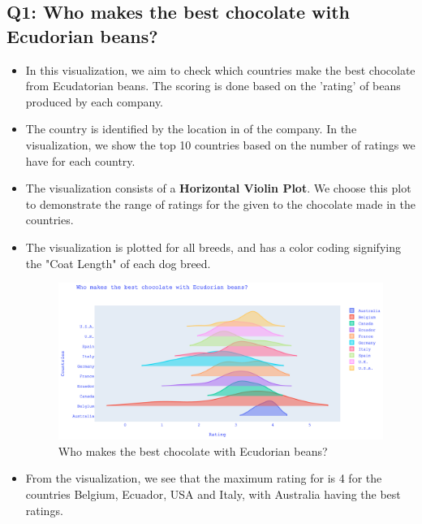 \documentclass[a4paper]{article}
\begin{document}
\subsection{Q1: Who makes the best chocolate with Ecudorian beans?}
\begin{itemize}
    \item In this visualization, we aim to check which countries make the best chocolate from Ecudatorian beans. The scoring is done based on the 'rating' of beans produced by each company.
    \item The country is identified by the location in of the company. In the visualization, we show the top 10 countries based on the number of ratings we have for each country.
    \item The visualization consists of a \textbf{Horizontal Violin Plot}. We choose this plot to demonstrate the range of ratings for the given to the chocolate made in the countries.
    \item The visualization is plotted for all breeds, and has a color coding signifying the "Coat Length" of each dog breed.
    \begin{figure}[H]
        \centering
        \includegraphics[width=1.0\textwidth]{violin}
        \caption{Who makes the best chocolate with Ecudorian beans?}
        \label{fig:violin}
    \end{figure}
    \item From the visualization, we see that the maximum rating for is 4 for the countries Belgium, Ecuador, USA and Italy, with Australia having the best ratings. 
\end{itemize}
\end{document}

